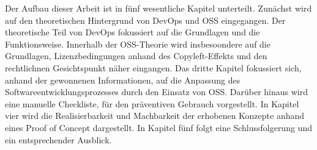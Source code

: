 Der Aufbau dieser Arbeit ist in fünf wesentliche Kapitel unterteilt. Zunächst wird auf den theoretischen Hintergrund von DevOps und OSS eingegangen. Der theoretische Teil von DevOps fokussiert auf die Grundlagen und die Funktionsweise. Innerhalb der OSS-Theorie wird insbesoondere auf die Grundlagen, Lizenzbedingungen anhand des Copyleft-Effekts und den rechtlichnen Gesichtspunkt näher eingangen. Das dritte Kapitel fokussiert sich, anhand der gewonnenen Informationen, auf die Anpassung des Softwareentwicklungsprozesses durch den Einsatz von OSS. Darüber hinaus wird eine manuelle Checkliste, für den präventiven Gebrauch vorgestellt. In Kapitel vier wird die Realisierbarkeit und Machbarkeit der erhobenen Konzepte anhand eines Proof of Concept dargestellt. In Kapitel fünf folgt eine Schlussfolgerung und ein entsprechender Ausblick. 